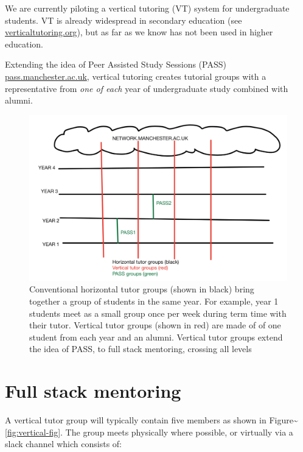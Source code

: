 \documentclass[12pt,]{book}
\begin{document}
We are currently piloting a vertical tutoring (VT) system for undergraduate students. VT is already widespread in secondary education (see \href{https://www.verticaltutoring.org/}{verticaltutoring.org}), but as far as we know has not been used in higher education.

Extending the idea of Peer Assisted Study Sessions (PASS) \href{http://www.pass.manchester.ac.uk}{pass.manchester.ac.uk}, vertical tutoring creates tutorial groups with a representative from \emph{one of each} year of undergraduate study combined with alumni.

\begin{figure}

{\centering \includegraphics[width=1\linewidth]{images/vertical-tutor-groups} 

}

\caption{Conventional horizontal tutor groups (shown in black) bring together a group of students in the same year. For example, year 1 students meet as a small group once per week during term time with their tutor. Vertical tutor groups (shown in red) are made of of one student from each year and an alumni. Vertical tutor groups extend the idea of PASS, to full stack mentoring, crossing all levels}\label{fig:unnamed-chunk-7}
\end{figure}

\hypertarget{full-stack-mentoring}{%
\section{Full stack mentoring}\label{full-stack-mentoring}}

A vertical tutor group will typically contain five members as shown in Figure\textasciitilde{}\ref{fig:vertical-fig}. The group meets physically where possible, or virtually via a slack channel which consists of:
\end{document}
